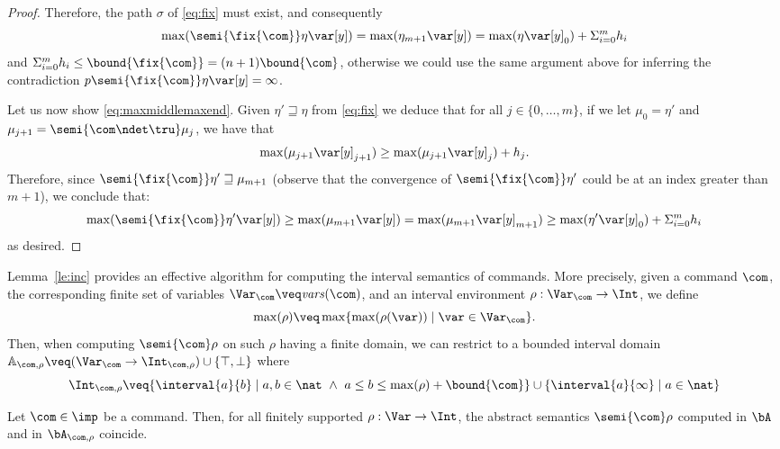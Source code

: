 \begin{proof}
  \noindent
  Therefore, the path \(\sigma\) of \eqref{eq:fix} must exist, and consequently
  \[\max(\semi{\fix{\com}} \eta \var[y]) = \max(\eta_{m+1} \var[y]) = \max(\eta  \var[y]_0) + \Sigma_{i=0}^m h_i\]
  and
  \(\Sigma_{i=0}^m h_i \leq \bound{\fix{\com}}=(n+1)\bound{\com}\),
  otherwise we could use the same argument above for inferring the
  contradiction \(p\semi{\fix{\com}} \eta \var[y] = \infty\).

  \medskip

  Let us now show \eqref{eq:maxmiddlemaxend}. Given
  \(\eta' \sqsupseteq \eta\) from \eqref{eq:fix} we deduce that for
  all \(j \in \{ 0, \ldots, m\}\), if we let \(\mu_0 = \eta'\) and
  \(\mu_{j+1} = \semi{\com \ndet \tru} \mu_j\), we have that
  \[
  \max(\mu_{j+1} \var[y]_{j+1}) \geq \max(\mu_{j+1} \var[y]_{j}) + h_j.
  \]
  Therefore, since \(\semi{\fix{\com}} \eta' \sqsupseteq \mu_{m+1}\)
  (observe that the convergence of \(\semi{\fix{\com}} \eta' \) could
  be at an index greater than \(m+1\)), we conclude that:
  \[\max(\semi{\fix{\com}} \eta' \var[y]) \geq \max(\mu_{m+1}
  \var[y]) = \max(\mu_{m+1} \var[y]_{m+1}) \geq \max(\eta' \var[y]_0)
  + \Sigma_{i=0}^m h_i\] as desired.
\end{proof}

Lemma~\ref{le:inc} provides an effective algorithm for computing the
interval semantics of commands. More precisely, given a command
\(\com\), the corresponding finite set of variables
\(\Var_{\com} \veq \mathit{vars}(\com)\), and an interval environment
\(\rho : \Var_{\com} \to \Int\), we define
\[\max(\rho) \veq \max \{ \max(\rho(\var)) \mid \var \in \Var_{\com}
  \}.\]
%
Then, when computing \(\semi{\com} \rho\) on such \(\rho\)
having a finite domain, we can restrict to a bounded interval domain
\(\mathbb{A}_{\com,\rho} \veq (\Var_{\com} \to \Int_{\com,\rho}) \cup
\{ \top, \bot \}\) where
\[
  \Int_{\com,\rho} \veq \{ \interval{a}{b} \mid a, b \in \nat\ \land\
  a \leq b \leq \max(\rho) + \bound{\com}\} \cup
  \{\interval{a}{\infty} \mid a \in \nat \}
\]


\begin{lemma}
  Let \(\com\in \imp\) be a command. Then, for all finitely supported
  \(\rho : \Var \to \Int\), the abstract semantics
  \(\semi{\com} \rho \)
  computed in \(\bA\) and in \(\bA_{\com,\rho}\)
  coincide.
\end{lemma}

